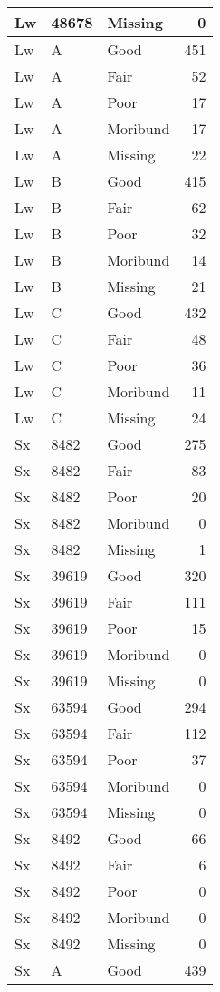 \documentclass[
]{article}
\begin{document}
\begin{tabular}{l|l|l|r}
\hline
Lw & 48678 & Missing & 0\\
\hline
Lw & A & Good & 451\\
\hline
Lw & A & Fair & 52\\
\hline
Lw & A & Poor & 17\\
\hline
Lw & A & Moribund & 17\\
\hline
Lw & A & Missing & 22\\
\hline
Lw & B & Good & 415\\
\hline
Lw & B & Fair & 62\\
\hline
Lw & B & Poor & 32\\
\hline
Lw & B & Moribund & 14\\
\hline
Lw & B & Missing & 21\\
\hline
Lw & C & Good & 432\\
\hline
Lw & C & Fair & 48\\
\hline
Lw & C & Poor & 36\\
\hline
Lw & C & Moribund & 11\\
\hline
Lw & C & Missing & 24\\
\hline
Sx & 8482 & Good & 275\\
\hline
Sx & 8482 & Fair & 83\\
\hline
Sx & 8482 & Poor & 20\\
\hline
Sx & 8482 & Moribund & 0\\
\hline
Sx & 8482 & Missing & 1\\
\hline
Sx & 39619 & Good & 320\\
\hline
Sx & 39619 & Fair & 111\\
\hline
Sx & 39619 & Poor & 15\\
\hline
Sx & 39619 & Moribund & 0\\
\hline
Sx & 39619 & Missing & 0\\
\hline
Sx & 63594 & Good & 294\\
\hline
Sx & 63594 & Fair & 112\\
\hline
Sx & 63594 & Poor & 37\\
\hline
Sx & 63594 & Moribund & 0\\
\hline
Sx & 63594 & Missing & 0\\
\hline
Sx & 8492 & Good & 66\\
\hline
Sx & 8492 & Fair & 6\\
\hline
Sx & 8492 & Poor & 0\\
\hline
Sx & 8492 & Moribund & 0\\
\hline
Sx & 8492 & Missing & 0\\
\hline
Sx & A & Good & 439\\

\end{tabular}
\end{document}
